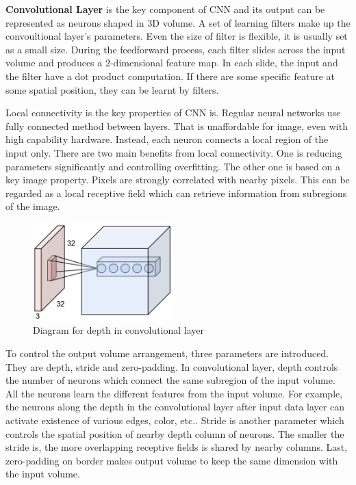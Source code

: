\textbf{Convolutional Layer} is the key component of CNN and its output can be represented as neurons shaped in 3D volume. A set of learning filters make up the convoultional layer's parameters. Even the size of filter is flexible, it is usually set as a small size. During the feedforward process, each filter slides across the input volume and produces a $2$-dimensional feature map. In each slide, the input and the filter have a dot product computation. If there are some specific feature at some spatial position, they can be learnt by filters.

Local connectivity is the key properties of CNN is. Regular neural networks use fully connected method between layers. That is unaffordable for image, even with high capability hardware. Instead, each neuron connects a local region of the input only. There are two main benefits from local connectivity. One is reducing parameters significantly and controlling overfitting. The other one is based on a key image property. Pixels are strongly correlated with nearby pixels. This can be regarded as a local receptive field which can retrieve information from subregions of the image.

\graphicspath{ {./Figures/} }
\begin{figure}
  \begin{center}
    \includegraphics[width=0.48\textwidth]{depthcol.jpeg}
  \end{center}
  \caption{Diagram for depth in convolutional layer}
\end{figure}
To control the output volume arrangement, three parameters are introduced. They are depth, stride and zero-padding. In convolutional layer, depth controls the number of neurons which connect the same subregion of the input volume. All the neurons learn the different features from the input volume. For example, the neurons along the depth in the convolutional layer after input data layer can activate existence of various edges, color, etc.. Stride is another parameter which controls the spatial position of nearby depth column of neurons. The smaller the stride is, the more overlapping receptive fields is shared by nearby columns. Last, zero-padding on border makes output volume to keep the same dimension with the input volume.

